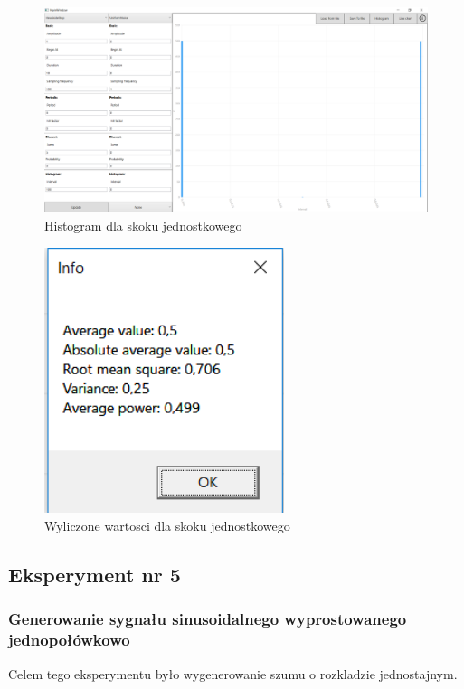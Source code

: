 \documentclass[12pt]{article}
\begin{document}
\begin{figure}[H]
 \centering
 \includegraphics[width=14cm]{images/heav1hist.PNG}
 \vspace{-0.3cm}
 \caption{Histogram dla skoku jednostkowego}
 \label{gui}
\end{figure}

\begin{figure}[H]
 \centering
 \includegraphics[width=7cm]{images/heav1info.PNG}
 \vspace{-0.3cm}
 \caption{Wyliczone wartosci dla skoku jednostkowego}
 \label{gui}
\end{figure}



\subsection{Eksperyment nr 5 }
\subsubsection{Generowanie sygnału sinusoidalnego wyprostowanego jednopołówkowo}
Celem tego eksperymentu było wygenerowanie szumu o rozkladzie jednostajnym.
\end{document}
